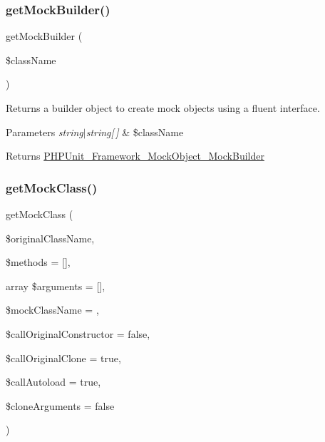 \subsubsection{\texorpdfstring{get\+Mock\+Builder()}{getMockBuilder()}}
{\footnotesize\ttfamily get\+Mock\+Builder (\begin{DoxyParamCaption}\item[{}]{\$class\+Name }\end{DoxyParamCaption})}

Returns a builder object to create mock objects using a fluent interface.


\begin{DoxyParams}{Parameters}
{\em string$\vert$string\mbox{[}$\,$\mbox{]}} & \$class\+Name\\
\hline
\end{DoxyParams}
\begin{DoxyReturn}{Returns}
\mbox{\hyperlink{class_p_h_p_unit___framework___mock_object___mock_builder}{P\+H\+P\+Unit\+\_\+\+Framework\+\_\+\+Mock\+Object\+\_\+\+Mock\+Builder}} 
\end{DoxyReturn}
\mbox{\label{class_p_h_p_unit___framework___test_case_a0b3ef9c03e9d69dcec2a86964b8fd46c}} 
\subsubsection{\texorpdfstring{get\+Mock\+Class()}{getMockClass()}}
{\footnotesize\ttfamily get\+Mock\+Class (\begin{DoxyParamCaption}\item[{}]{\$original\+Class\+Name,  }\item[{}]{\$methods = {\ttfamily \mbox{[}\mbox{]}},  }\item[{array}]{\$arguments = {\ttfamily \mbox{[}\mbox{]}},  }\item[{}]{\$mock\+Class\+Name = {\ttfamily \textquotesingle{}\textquotesingle{}},  }\item[{}]{\$call\+Original\+Constructor = {\ttfamily false},  }\item[{}]{\$call\+Original\+Clone = {\ttfamily true},  }\item[{}]{\$call\+Autoload = {\ttfamily true},  }\item[{}]{\$clone\+Arguments = {\ttfamily false} }\end{DoxyParamCaption})\hspace{0.3cm}{\ttfamily [protected]}}

